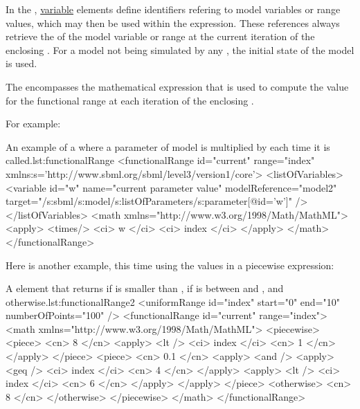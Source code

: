 In the , \hyperref[class:variable]{variable} elements define identifiers refering to model variables or range values, which may then be used within the  expression.
These references always retrieve the  of the model variable or range at the current iteration of the enclosing .
For a model not being simulated by any , the initial state of the model is used.

The  encompasses the mathematical expression that is used to compute the value for the functional range at each iteration of the enclosing .

For example:

\begin{myXmlLst}{An example of a  where a parameter  of model  is multiplied by  each time it is called.}{lst:functionalRange}
  <functionalRange id="current" range="index"
      xmlns:s='http://www.sbml.org/sbml/level3/version1/core'>
    <listOfVariables>
      <variable id="w" name="current parameter value" modelReference="model2"
          target="/s:sbml/s:model/s:listOfParameters/s:parameter[@id='w']" />
    </listOfVariables>
    <math xmlns="http://www.w3.org/1998/Math/MathML">
      <apply>
        <times/>
        <ci> w </ci>
        <ci> index </ci>
      </apply>
    </math>
  </functionalRange>
\end{myXmlLst}

Here is another example, this time using the values in a piecewise expression: 

\begin{myXmlLst}{A  element that returns  if  is smaller than ,  if  is between  and , and  otherwise.}{lst:functionalRange2}
        <uniformRange id="index" start="0" end="10" numberOfPoints="100" />
        <functionalRange id="current" range="index">
          <math xmlns="http://www.w3.org/1998/Math/MathML">
            <piecewise>
              <piece>
                <cn> 8 </cn>
                <apply>
                  <lt />
                  <ci> index </ci>
                  <cn> 1 </cn>
                </apply>
              </piece>
              <piece>
                <cn> 0.1 </cn>
                <apply>
                  <and />
                  <apply>
                    <geq />
                    <ci> index </ci>
                    <cn> 4 </cn>
                  </apply>
                  <apply>
                    <lt />
                    <ci> index </ci>
                    <cn> 6 </cn>
                  </apply>
                </apply>
              </piece>
              <otherwise>
                <cn> 8 </cn>
              </otherwise>
            </piecewise>
          </math>
        </functionalRange>
\end{myXmlLst}


